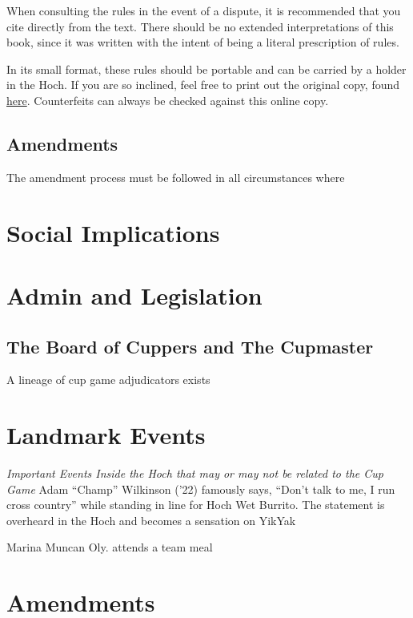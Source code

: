 \documentclass[12pt]{IEEEtran}
\begin{document}
When consulting the rules in the event of a dispute, it is recommended that you cite directly from the text. There should be no extended interpretations of this book, since it was written with the intent of being a literal prescription of rules.

In its small format, these rules should be portable and can be carried by a holder in the Hoch. If you are so inclined, feel free to print out the original copy, found \href{https://www.cs.hmc.edu/~hpick/Cupgame%20Rules.pdf}{here}. Counterfeits can always be checked against this online copy.
\subsection{Amendments}
The amendment process must be followed in all circumstances where
\section{Social Implications}
\label{section:social}
\section{Admin and Legislation}
\subsection{The Board of Cuppers and The Cupmaster}
A lineage of cup game adjudicators exists
\section{Landmark Events}
\textit{Important Events Inside the Hoch that may or may not be related to the Cup Game}
Adam ``Champ'' Wilkinson ('22) famously says, ``Don't talk to me, I run cross country'' while standing in line for Hoch Wet Burrito. The statement is overheard in the Hoch and becomes a sensation on YikYak

Marina Muncan Oly. attends a team meal


\section{Amendments}
\end{document}
